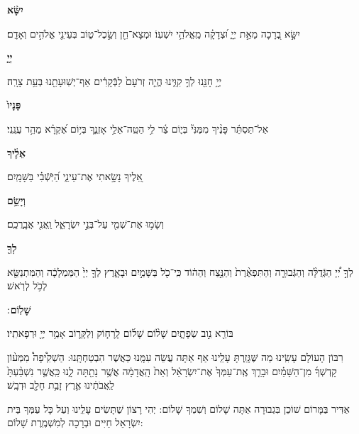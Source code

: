 \documentclass[twoside, openany, parskip=half, 11pt]{book}
\begin{document}
	
\textbf{יִשָּׂ֨א}
	\hfill	\begin{footnotesize}
	יִשָּׂ֣א בְ֭רָכָה מֵאֵ֣ת יְיָ֑ וּ֝צְדָקָ֗ה מֵֽאֱלֹהֵ֥י יִשְׁעֽוֹ׃ 	וּמְצָא־חֵ֖ן וְשֵׂ֣כֶל־ט֑וֹב בְּעֵינֵ֖י אֱלֹהִ֣ים וְאָדָֽם׃\\
	\end{footnotesize}
\textbf{יְיָ֤}
	\hfill \begin{footnotesize}
		יְיָ֥ חָנֵּ֖נוּ לְךָ֣ קִוִּ֑ינוּ הֱיֵ֤ה זְרֹעָם֙ לַבְּֿקָרִ֔ים אַף־יְשֽׁוּעָתֵ֖נוּ בְּעֵ֥ת צָרָֽה׃\\
	\end{footnotesize}
\textbf{פָּנָיו֙}
	\hfill \begin{footnotesize}
		אַל־תַּסְתֵּ֬ר פָּנֶ֨יךָ מִמֶּנִּי֘ בְּי֢וֹם צַ֫ר לִ֥י הַטֵּֽה־אֵלַ֥י אָזְנֶ֑ךָ 
		בְּי֥וֹם אֶ֝קְרָ֗א מַהֵ֥ר עֲנֵֽנִי׃\\
	\end{footnotesize}
\textbf{אֵלֶ֔יךָ}
	\hfill	\begin{footnotesize}
	אֵ֭לֶיךָ נָשָׂ֣אתִי אֶת־עֵינַ֑י הַ֝יֹּֽשְֿׁבִ֗י בַּשָּׁמָֽיִם׃\\
	\end{footnotesize}
\textbf{וְיָשֵׂ֥ם}
	\hfill	\begin{footnotesize}
	וְשָׂמ֥וּ אֶת־שְׁמִ֖י עַל־בְּנֵ֣י יִשְׂרָאֵ֑ל וַֽאֲנִ֖י אֲבָֽרֲכֵֽם׃\\
	\end{footnotesize}
\textbf{לְךָ֖}
	\hfill \begin{footnotesize}
	לְךָ֣ יְ֠יָ הַגְּֿדֻלָּ֨ה וְהַגְּֿבוּרָ֤ה וְהַתִּפְאֶ֨רֶת֙ וְהַנֵּ֣צַח וְהַה֔וֹד 
		כִּֽי־כֹ֖ל בַּשָּׁמַ֣יִם וּבָאָ֑רֶץ לְךָ֤ יְיָ֙ הַמַּמְלָכָ֔ה וְהַמִּתְנַשֵּׂ֖א 
		לְכֹ֥ל לְרֹֽאשׁ׃\\
	\end{footnotesize}
\textbf{שָׁלֽוֹם}
׃	\hfill \begin{footnotesize}
	בּוֹרֵ֖א נִ֣וב שְׂפָתָ֑יִם שָׁל֨וֹם שָׁל֜וֹם לָֽרָח֧וֹק וְלַקָּר֛וֹב 
		אָמַ֥ר יְיָ֖ וּרְפָאתִֽיו׃
\end{footnotesize}

\clearpage

\begin{paracol}{2}
רִבּוֹן הָעוֹלָם עָשִֽׂינוּ מַה שֶּׁגָּזַֽרְתָּ עָלֵֽינוּ אַף אַתָּה עֲשֵׂה עִמָּֽנוּ כַּאֲשֶׁר הִבְטַחְתָּֽנוּ:  הַשְׁקִ֩יפָה֩ מִמְּע֨וֹן קָדְשְׁךָ֜ מִן־הַשָּׁמַ֗יִם וּבָרֵ֤ךְ אֶֽת־עַמְּךָ֙ אֶת־יִשְׂרָאֵ֔ל וְאֵת֙ הָֽאֲדָמָ֔ה אֲשֶׁ֥ר נָתַ֖תָּה לָ֑נוּ כַּֽאֲשֶׁ֤ר נִשְׁבַּ֨עְתָּ֙ לַֽאֲבֹתֵ֔ינוּ אֶ֛רֶץ זָבַ֥ת חָלָ֖ב וּדְבָֽשׁ׃

\switchcolumn

\kahal
אַדִּיר בַּמָּרוֹם שׁוֹכֵן בִּגְבוּרָה אַתָּה שָׁלוֹם וְשִׁמְךָ שָׁלוֹם: יְהִי רָצוֹן שֶׁתָּשִׂים עָלֵֽינוּ וְעַל כָּל עַמְּךָ בֵּית יִשְׂרָאֵל חַיִּים וּבְרָכָה לְמִשְׁמֶֽרֶת שָׁלוֹם:
\end{paracol}
\end{document}
